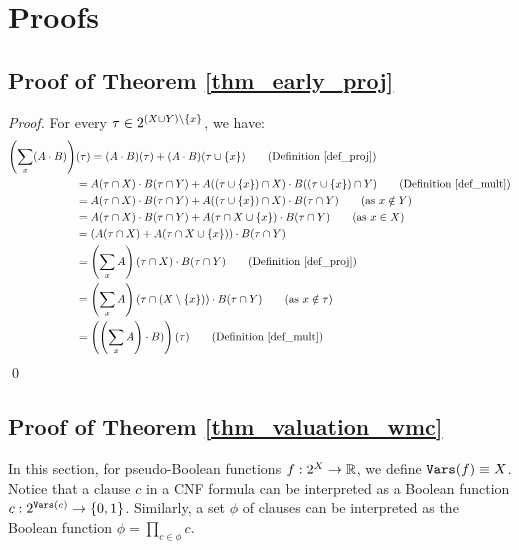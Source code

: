 \section{Proofs}
\label{sec_proofs}


\subsection{Proof of Theorem \ref{thm_early_proj}}

\begin{proof}
    For every $\tau \in 2^{(X \cup Y) \setminus \left\{ x \right\}}$, we have:
    \begin{align*}
      \pars{\proj_x (A \mult B)} &(\tau)
       = (A \mult B)(\tau) + (A \mult B)(\tau \cup \set{x})
        \tag{Definition \ref{def_proj}} \\
      & = A(\tau \cap X) \mult B(\tau \cap Y)+ A((\tau \cup \set{x}) \cap X) \mult B((\tau \cup \set{x}) \cap Y)
        \tag{Definition \ref{def_mult}} \\
      & = A(\tau \cap X) \mult B(\tau \cap Y)+ A((\tau \cup \set{x}) \cap X) \mult B(\tau \cap Y)
        \tag{as $x \notin Y$} \\
      & = A(\tau \cap X) \mult B(\tau \cap Y)+ A(\tau \cap X \cup \set{x}) \mult B(\tau \cap Y)
        \tag{as $x \in X$} \\
      & = (A(\tau \cap X) + A(\tau \cap X \cup \set{x})) \mult B(\tau \cap Y) \\
      & = \pars{\proj_x A}(\tau \cap X) \mult B(\tau \cap Y)
        \tag{Definition \ref{def_proj}} \\
      & = \pars{\proj_x A}(\tau \cap (X \setminus \set{x})) \mult B(\tau \cap Y)
        \tag{as $x \notin \tau$} \\
      & = \pars{\pars{\proj_x A} \mult B)}(\tau)
        \tag{Definition \ref{def_mult}}
    \end{align*}
\qed
\end{proof}


\subsection{Proof of Theorem \ref{thm_valuation_wmc}}

In this section, for pseudo-Boolean functions $f : 2^X \to \mathbb{R}$, we define $\texttt{\upshape Vars}(f) \equiv X$.
Notice that a clause $c$ in a CNF formula can be interpreted as a Boolean function $c : 2^{\texttt{\upshape Vars}(c)} \to \left\{ 0, 1 \right\}$.
Similarly, a set $\phi$ of clauses can be interpreted as the Boolean function $\phi = \prod_{c \in \phi} c$.

